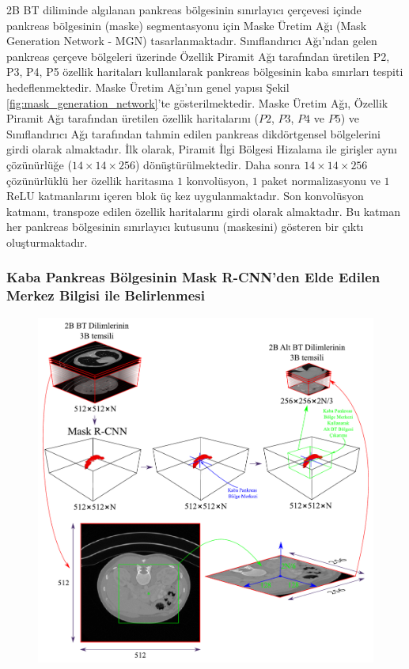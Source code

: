2B BT diliminde algılanan pankreas bölgesinin sınırlayıcı çerçevesi içinde pankreas bölgesinin (maske) segmentasyonu için Maske Üretim Ağı (Mask Generation Network - MGN) tasarlanmaktadır. Sınıflandırıcı Ağı'ndan gelen pankreas çerçeve bölgeleri üzerinde Özellik Piramit Ağı tarafından üretilen P2, P3, P4, P5 özellik haritaları kullanılarak pankreas bölgesinin kaba sınırları tespiti hedeflenmektedir. Maske Üretim Ağı'nın genel yapısı Şekil \ref{fig:mask_generation_network}’te gösterilmektedir. Maske Üretim Ağı, Özellik Piramit Ağı tarafından üretilen özellik haritalarını ($P2$, $P3$, $P4$ ve $P5$) ve Sınıflandırıcı Ağı tarafından tahmin edilen pankreas dikdörtgensel bölgelerini girdi olarak almaktadır. İlk olarak, Piramit İlgi Bölgesi Hizalama ile girişler aynı çözünürlüğe ($14 \times 14 \times 256$) dönüştürülmektedir. Daha sonra $14 \times 14 \times 256$ çözünürlüklü her özellik haritasına $1$ konvolüsyon, $1$ paket normalizasyonu ve $1$ ReLU katmanlarını içeren blok üç kez uygulanmaktadır. Son konvolüsyon katmanı, transpoze edilen özellik haritalarını girdi olarak almaktadır. Bu katman her pankreas bölgesinin sınırlayıcı kutusunu (maskesini) gösteren bir çıktı oluşturmaktadır.

\subsubsection{Kaba Pankreas Bölgesinin Mask R-CNN'den Elde Edilen Merkez Bilgisi ile Belirlenmesi}

\begin{figure}[h!]
	\begin{center}
		\vspace{0.4cm}
		{
			\vspace{0.4cm}
			\includegraphics[scale=0.61]{Yapilan-Calismalar/Figures/center_of_mass.pdf}
		}
	\end{center}
\end{figure} 

